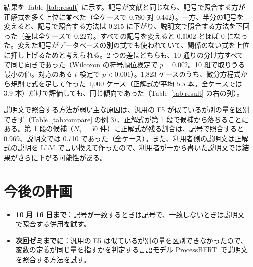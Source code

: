 \documentclass[a4j,dvipdfmx,10pt]{jresume}
\begin{document}
結果を Table~\ref{tab:result} に示す。記号が文献と同じなら、記号で照合する方が正解式を多く上位に並べた（全ケースで 0.780 対 0.442）。一方、半分の記号を変えると、記号で照合する方法は 0.215 に下がり、説明文で照合する方法を下回った（差は全ケースで 0.227）。すべての記号を変えると 0.0002 とほぼ 0 になった。変えた記号がデータベースの別の式でも使われていて、関係のない式を上位に押し上げるためと考えられる。2 つの差はどちらも、10 通りの分け方すべてで同じ向きであった（Wilcoxon の符号順位検定で $p = 0.002$。10 組で取りうる最小の値。対応のある $t$ 検定で $p < 0.001$）。1{,}823 ケースのうち、微分方程式から規則で式を足して作った 1{,}000 ケース（正解式が平均 5.5 本。全ケースでは 3.9 本）だけで評価しても、同じ傾向であった（Table~\ref{tab:result} の右の列）。

説明文で照合する方法が弱い主な原因は、汎用の E5 が似ているが別の量を区別できず（Table~\ref{tab:compare} の例 3）、正解式が第 1 段で候補から落ちることにある。第 1 段の候補（$N_1 = 50$ 件）に正解式が残る割合は、記号で照合すると 0.969、説明文では 0.710 であった（全ケース）。また、利用者側の説明文は正解式の説明を LLM で言い換えて作ったので、利用者が一から書いた説明文では結果がさらに下がる可能性がある。


\section{今後の計画}\label{sec:plan}
\begin{itemize}[leftmargin=1.5em]
  \item \textbf{10 月 16 日まで}：記号が一致するときは記号で、一致しないときは説明文で照合する併用を試す。
  \item \textbf{次回ゼミまでに}：汎用の E5 は似ているが別の量を区別できなかったので、変数の定義が同じ量を指すかを判定する言語モデル ProcessBERT~\citep{ProcessBERT}で説明文を照合する方法を試す。
\end{itemize}





\end{document}
